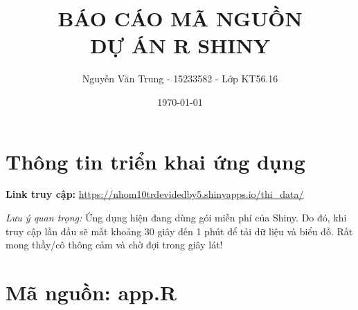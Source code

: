 \documentclass[12pt, a4paper]{article}
\title{\textbf{BÁO CÁO MÃ NGUỒN\\DỰ ÁN R SHINY}}
\author{Nguyễn Văn Trung - 15233582 - Lớp KT56.16}
\date{\today}
\begin{document}
\maketitle
\newpage

\section*{Thông tin triển khai ứng dụng}
\textbf{Link truy cập:} \url{https://nhom10trdevidedby5.shinyapps.io/thi_data/}

\vspace{0.5cm}
\noindent\textit{Lưu ý quan trọng:} Ứng dụng hiện đang dùng gói miễn phí của Shiny. Do đó, khi truy cập lần đầu sẽ mất khoảng 30 giây đến 1 phút để tải dữ liệu và biểu đồ. Rất mong thầy/cô thông cảm và chờ đợi trong giây lát!
\newpage
\section{Mã nguồn: app.R}
\end{document}
